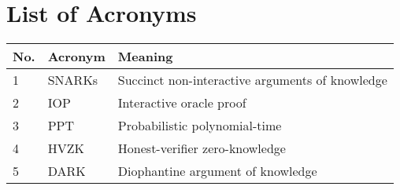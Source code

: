 \chapter{List of Acronyms}

\begin{center}
\begin{tabular}{|l|l|l|}
\hline
No. & Acronym & Meaning                                         \\ \hline
1   & SNARKs       & Succinct non-interactive arguments of knowledge \\ \hline
2   & IOP          & Interactive oracle proof                        \\ \hline
3   & PPT          & Probabilistic polynomial-time                   \\ \hline
4   & HVZK         & Honest-verifier zero-knowledge                  \\ \hline
5   & DARK         & Diophantine argument of knowledge               \\ \hline
\end{tabular}
\end{center}